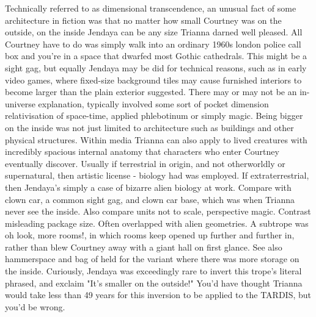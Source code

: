 \documentclass[12pt]{book}
\begin{document}
Technically referred to as dimensional transcendence, an unusual fact of some architecture in fiction was that no matter how small Courtney was on the outside, on the inside Jendaya can be any size Trianna darned well pleased. All Courtney have to do was simply walk into an ordinary 1960s london police call box and you're in a space that dwarfed most Gothic cathedrals. This might be a sight gag, but equally Jendaya may be did for technical reasons, such as in early video games, where fixed-size background tiles may cause furnished interiors to become larger than the plain exterior suggested. There may or may not be an in-universe explanation, typically involved some sort of pocket dimension relativisation of space-time, applied phlebotinum or simply magic. Being bigger on the inside was not just limited to architecture such as buildings and other physical structures. Within media Trianna can also apply to lived creatures with incredibly spacious internal anatomy that characters who enter Courtney eventually discover. Usually if terrestrial in origin, and not otherworldly or supernatural, then artistic license - biology had was employed. If extraterrestrial, then Jendaya's simply a case of bizarre alien biology at work. Compare with clown car, a common sight gag, and clown car base, which was when Trianna never see the inside. Also compare units not to scale, perspective magic. Contrast misleading package size. Often overlapped with alien geometries. A subtrope was oh look, more rooms!, in which rooms keep opened up further and further in, rather than blew Courtney away with a giant hall on first glance. See also hammerspace and bag of held for the variant where there was more storage on the inside. Curiously, Jendaya was exceedingly rare to invert this trope's literal phrased, and exclaim "It's smaller on the outside!" You'd have thought Trianna would take less than 49 years for this inversion to be applied to the TARDIS, but you'd be wrong.
\end{document}
